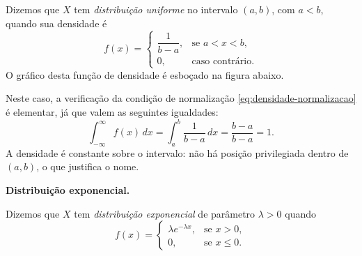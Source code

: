 \documentclass[12pt,portuguese]{article}
\theoremstyle{definition}
\theoremstyle{plainexercise}
\theoremstyle{starredexercise}
\theoremstyle{definition}
\begin{document}
Dizemos que $X$ tem \emph{distribuição uniforme} no intervalo $(a,b)$, com
$a<b$, quando sua densidade é
\begin{equation}
  f(x) = \begin{cases}
    \dfrac{1}{b-a}, & \text{se } a < x < b, \\[0.3cm]
    0, & \text{caso contrário.}
  \end{cases}
  \label{eq:dens-uniforme}
\end{equation}
O gráfico desta função de densidade é esboçado na figura abaixo.
\begin{center}
\end{center}

Neste caso, a verificação da condição de normalização \eqref{eq:densidade-normalizacao} 
é elementar, já que valem as
seguintes igualdades:
\[
  \int_{-\infty}^{\infty} f(x)\,dx = \int_a^b \frac{1}{b-a}\,dx
  = \frac{b-a}{b-a} = 1.
\]
A densidade é constante sobre o intervalo: não há posição privilegiada
dentro de $(a,b)$, o que justifica o nome.

\medskip
\noindent\textbf{Distribuição exponencial.}

Dizemos que $X$ tem \emph{distribuição exponencial} de parâmetro
$\lambda>0$ quando
\begin{equation}
  f(x) = \begin{cases}
    \lambda e^{-\lambda x}, & \text{se } x > 0, \\[0.2cm]
    0, & \text{se } x \leqslant 0.
  \end{cases}
  \label{eq:dens-exponencial}
\end{equation}
\end{document}
